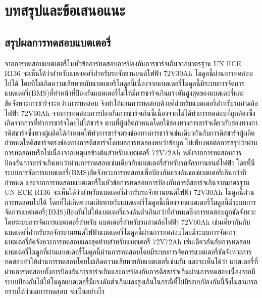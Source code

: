 \chapter{บทสรุปและข้อเสนอแนะ}
\section{สรุปผลการทดสอบแบตเตอรี่}
จากการทดสอบแบตเตอรี่ในหัวข้อการทดสอบการป้องกันการชาร์จเกินจากมาตรฐาน UN ECE R136 จะเห็นได้ว่าสำหรับแบตเตอรี่สำหรับรถจักยานยนต์ไฟฟ้า 72V30Ah โมดูลนี้ผ่านการทดสอบไปได้
โดยที่ไม่เกิดความเสียหายกับแบตเตอรี่โมดูลนี้เนื่องจากแบตเตอรี่โมดูลนี้มีระบบการจัดการแบตเตอรี่(BMS)ที่ทำหน้าที่ป้องกันแบตเตอรี่ไม่ให้มีการชาร์จเกินแรงดันสูงสุดของแบตเตอรี่และขัดจังหวะการชาร์จระหว่างการทดสอบ
จึงทำให้ผ่านการทดสอบด้วยดีสำหรับแบตเตอรี่สำหรับรถสามล้อไฟฟ้า 72V60Ah จากการทดสอบการป้องกันการชาร์จเกินนี้เนื่องจากไม่ได้ทำการทดสอบที่ถูกต้องซึ่งเกิดจากการที่ทำการชาร์จโดยไม่ได้ชาร์จ
ตามที่ผู้ผลิตกำหนดโดยใช้ช่องทางการชาร์จเดียวกับช่องทางการดิสชาร์จซึ่งทางผู้ผลิตได้กำหนดให้ทำการชาร์จตรงช่องทางการชาร์จเช่นเดียวกันกับการดิสชาร์จผู้ผลิตกำหนดให้ดิสชาร์จตรงช่องทางการดิสชาร์จโดยผลการทดลองพบว่าข้อมูล
ไม่เพียงพอต่อการสรุปว่าผ่านการทดสอบหรือไม่เนื่องจากเหตุผลข้างต้นสำหรับแบตเตอรี่ 72V72Ah หลังจากการทดสอบการป้องกันการชาร์จเกินพบว่าผ่านการทดสอบเช่นเดียวกับแบตเตอรี่สำหรับรถจักรยานยนต์ไฟฟ้า
โดยที่มีระบบการจัดการแบตเตอรี่(BMS)ขัดจังหวะการทดสอบเพื่อป้องกันแรงดันของแบตเตอรี่เกินกว่าที่กำหนด
\newline
\hspace*{2cm}
และจากการทดสอบแบตเตอรี่ในหัวข้อการทดสอบการป้องกันการดิสชาร์จเกินจากมาตรฐาน UN ECE R136 จะเห็นได้ว่าสำหรับแบตเตอรี่สำหรับรถจักยานยนต์ไฟฟ้า 72V30Ah โมดูลนี้ผ่านการทดสอบไปได้
โดยที่ไม่เกิดความเสียหายกับแบตเตอรี่โมดูลนี้เนื่องจากแบตเตอรี่โมดูลนี้มีระบบการจัดการแบตเตอรี่(BMS)ป้องกันไม่ให้แบตเตอรี่แรงดันต่ำเกินกว่าที่กำหนดซึ่งการทดสอบถูกขัดจังหวะโดยระบบการจัดการแบตเตอรี่สำหรับ
แบตเตอรี่สำหรับรถสามล้อไฟฟ้า 72V60Ah เช่นเดียวกันกับแบตเตอรี่สำหรับรถจักรยานยนต์ไฟฟ้าแบตเตอรี่โมดูลนี้ผ่านการทดสอบโดยมีระบบการจัดการแบตเตอรี่ขัดจังหวะการทดสอบและสุดท้ายสำหรับแบตเตอรี่ 72V72Ah
เช่นเดียวกันกับการทดสอบแบตเตอรี่โมดูลที่ผ่านแบตเตอรี่โมดูลนี้ผ่านการทดสอบโดยมีระบบการจัดการแบตเตอรี่ขัดจังหวะการทดสอบทำให้ผ่านการทดสอบโดยไม่เกิดความเสียหายกับแบตเตอรี่เช่นกัน และจะเห็นได้ว่า
แบตเตอรี่ที่ผ่านการทดสอบทั้งการป้องกันการชาร์จเกินและการป้องกันการดิสชาร์จเกินผ่านการทดสอบเนื่องจากมีระบบป้องกันไม่ให้โมดูลแบตเตอรี่มีแรงดันต่ำเกินและสูงเกินในกรณีที่ไม่มีระบบป้องกันนี้จึงไม่สามารถทราบได้ว่าผลการทดสอบ
จะเป็นอย่างไร
\newline
\hspace*{2cm}
